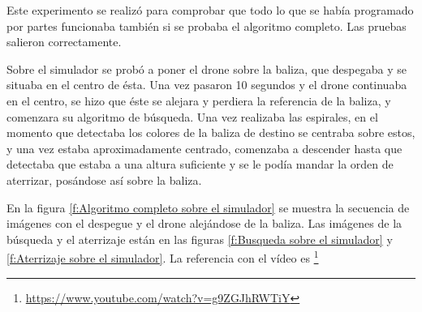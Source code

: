 \hspace{1cm} Este experimento se realiz\'o para comprobar que todo lo que se hab\'ia programado por partes funcionaba tambi\'en si se probaba el algoritmo completo. Las pruebas salieron correctamente.

\hspace{1cm} Sobre el simulador se prob\'o a poner el drone sobre la baliza, que despegaba y se situaba en el centro de \'esta. Una vez pasaron 10 segundos y el drone continuaba en el centro, se hizo que \'este se alejara y perdiera la referencia de la baliza, y comenzara su algoritmo de b\'usqueda. Una vez realizaba las espirales, en el momento que detectaba los colores de la baliza de destino se centraba sobre estos, y una vez estaba aproximadamente centrado, comenzaba a descender hasta que detectaba que estaba a una altura suficiente y se le pod\'ia mandar la orden de aterrizar, pos\'andose as\'i sobre la baliza. 

En la figura \ref{f:Algoritmo completo sobre el simulador} se muestra la secuencia de im\'agenes con el despegue y el drone alej\'andose de la baliza. Las im\'agenes de la b\'usqueda y el aterrizaje est\'an en las figuras \ref{f:Busqueda sobre el simulador} y \ref{f:Aterrizaje sobre el simulador}. La referencia con el v\'ideo es \footnote{\url{https://www.youtube.com/watch?v=g9ZGJhRWTiY}}

